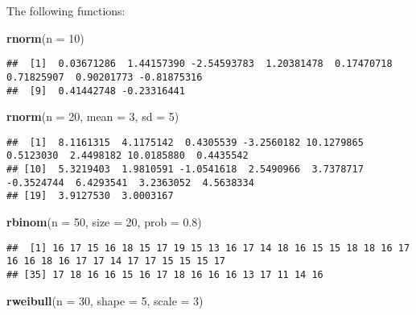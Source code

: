 \documentclass[]{book}
\newenvironment{Shaded}{\begin{snugshade}}{\end{snugshade}}
\newcommand{\KeywordTok}[1]{\textcolor[rgb]{0.13,0.29,0.53}{\textbf{{#1}}}}
\newcommand{\DataTypeTok}[1]{\textcolor[rgb]{0.13,0.29,0.53}{{#1}}}
\newcommand{\DecValTok}[1]{\textcolor[rgb]{0.00,0.00,0.81}{{#1}}}
\newcommand{\FloatTok}[1]{\textcolor[rgb]{0.00,0.00,0.81}{{#1}}}
\newcommand{\NormalTok}[1]{{#1}}
\begin{document}
The following functions:

\begin{Shaded}
\begin{Highlighting}[]
\KeywordTok{rnorm}\NormalTok{(}\DataTypeTok{n =} \DecValTok{10}\NormalTok{)}
\end{Highlighting}
\end{Shaded}

\begin{verbatim}
##  [1]  0.03671286  1.44157390 -2.54593783  1.20381478  0.17470718  0.71825907  0.90201773 -0.81875316
##  [9]  0.41442748 -0.23316441
\end{verbatim}

\begin{Shaded}
\begin{Highlighting}[]
\KeywordTok{rnorm}\NormalTok{(}\DataTypeTok{n =} \DecValTok{20}\NormalTok{, }\DataTypeTok{mean =} \DecValTok{3}\NormalTok{, }\DataTypeTok{sd =} \DecValTok{5}\NormalTok{)}
\end{Highlighting}
\end{Shaded}

\begin{verbatim}
##  [1]  8.1161315  4.1175142  0.4305539 -3.2560182 10.1279865  0.5123030  2.4498182 10.0185880  0.4435542
## [10]  5.3219403  1.9810591 -1.0541618  2.5490966  3.7378717 -0.3524744  6.4293541  3.2363052  4.5638334
## [19]  3.9127530  3.0003167
\end{verbatim}

\begin{Shaded}
\begin{Highlighting}[]
\KeywordTok{rbinom}\NormalTok{(}\DataTypeTok{n =} \DecValTok{50}\NormalTok{, }\DataTypeTok{size =} \DecValTok{20}\NormalTok{, }\DataTypeTok{prob =} \FloatTok{0.8}\NormalTok{)}
\end{Highlighting}
\end{Shaded}

\begin{verbatim}
##  [1] 16 17 15 16 18 15 17 19 15 13 16 17 14 18 16 15 15 18 18 16 17 16 16 18 16 17 17 14 17 17 15 15 15 17
## [35] 17 18 16 16 15 16 17 18 16 16 16 13 17 11 14 16
\end{verbatim}

\begin{Shaded}
\begin{Highlighting}[]
\KeywordTok{rweibull}\NormalTok{(}\DataTypeTok{n =} \DecValTok{30}\NormalTok{, }\DataTypeTok{shape =} \DecValTok{5}\NormalTok{, }\DataTypeTok{scale =} \DecValTok{3}\NormalTok{)}
\end{Highlighting}
\end{Shaded}
\end{document}
